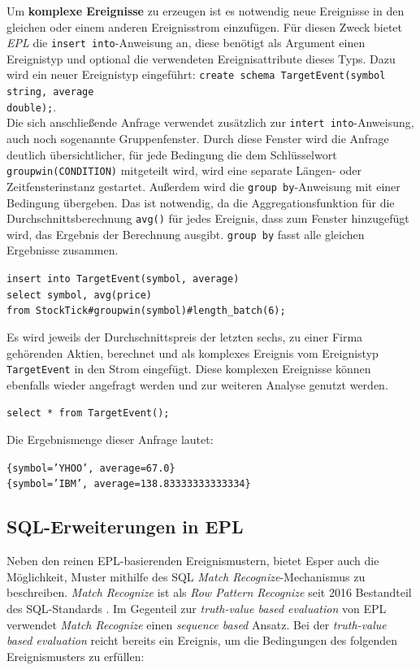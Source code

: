 \documentclass{acm_proc_article-sp}
\begin{document}
Um \textbf{komplexe Ereignisse} zu erzeugen ist es notwendig neue Ereignisse in den 
gleichen oder einem anderen Ereignisstrom einzufügen. Für diesen Zweck bietet 
\textit{EPL} die 
\texttt{insert into}-Anweisung an, diese benötigt als Argument einen Ereignistyp und 
optional die verwendeten Ereignisattribute dieses Typs. Dazu wird ein neuer Ereignistyp 
eingeführt: \texttt{create schema TargetEvent(symbol string, average\\ double);}.\\
Die sich anschließende Anfrage verwendet zusätzlich zur \texttt{intert into}-Anweisung, 
auch noch sogenannte Gruppenfenster. Durch diese Fenster wird die Anfrage deutlich 
übersichtlicher, für jede Bedingung die dem Schlüsselwort \texttt{groupwin(CONDITION)} 
mitgeteilt wird, wird eine separate Längen- oder Zeitfensterinstanz gestartet. Außerdem 
wird die \texttt{group by}-Anweisung mit einer Bedingung übergeben. Das ist notwendig, da 
die Aggregationsfunktion für die Durchschnittsberechnung \texttt{avg()} für jedes 
Ereignis, dass zum Fenster hinzugefügt wird, das Ergebnis der Berechnung ausgibt. 
\texttt{group by} fasst alle gleichen Ergebnisse zusammen.

\texttt{insert into TargetEvent(symbol, average)\\
select symbol, avg(price)\\
from StockTick\#groupwin(symbol)\#length\_batch(6);}

Es wird jeweils der Durchschnittspreis der letzten sechs, zu einer Firma gehörenden 
Aktien, berechnet und als komplexes Ereignis vom Ereignistyp \texttt{TargetEvent} in den 
Strom eingefügt. Diese komplexen Ereignisse können ebenfalls wieder angefragt werden und 
zur weiteren Analyse genutzt werden.

\texttt{select  * from TargetEvent();} 

Die Ergebnismenge dieser Anfrage lautet:

\texttt{\{symbol='YHOO', average=67.0\}}\\
\texttt{\{symbol='IBM', average=138.83333333333334\}}

\subsection{SQL-Erweiterungen in EPL}\label{sql}

Neben den reinen EPL-basierenden Ereignismustern, bietet Esper auch die Möglichkeit, 
Muster mithilfe des SQL \emph{Match Recognize}-Mechanismus zu beschreiben. \emph{Match 
Recognize} ist als \emph{Row Pattern Recognize} seit 2016 Bestandteil des SQL-Standards 
\cite{sql-2016}. Im Gegenteil zur \emph{truth-value based evaluation} von EPL verwendet 
\emph{Match Recognize} einen \emph{sequence based} Ansatz. Bei der \emph{truth-value 
based evaluation} reicht bereits ein Ereignis, um die Bedingungen des 
folgenden Ereignismusters zu erfüllen:
\end{document}
